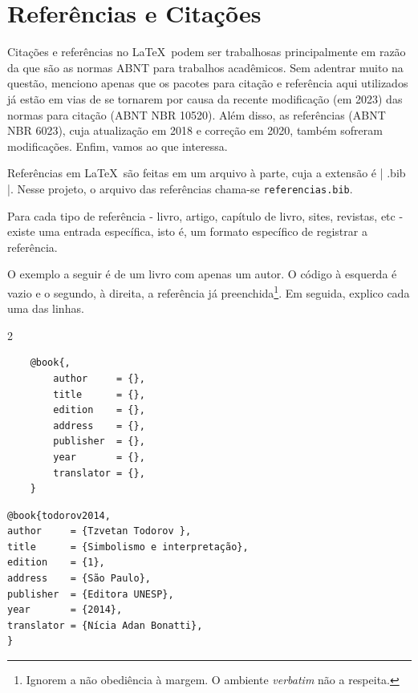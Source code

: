 \chapter{Referências e Citações}

Citações e referências no \LaTeX\ podem ser trabalhosas principalmente em razão da  que são as normas ABNT para trabalhos acadêmicos. Sem adentrar muito na questão, menciono apenas que os pacotes para citação e referência aqui utilizados já estão em vias de se tornarem  por causa da recente modificação (em 2023) das normas para citação (ABNT NBR 10520). Além disso, as referências (ABNT NBR 6023), cuja atualização em 2018 e correção em 2020, também sofreram modificações. Enfim, vamos ao que interessa.

Referências em \LaTeX\ são feitas em um arquivo à parte, cuja a extensão é | .bib |. Nesse projeto, o arquivo das referências chama-se \verb|referencias.bib|.

Para cada tipo de referência - livro, artigo, capítulo de livro, sites, revistas, etc - existe uma entrada específica, isto é, um formato específico de registrar a referência.

O exemplo a seguir é de um livro com apenas um autor. O código à esquerda é vazio e o segundo, à direita, a referência já preenchida\footnote{Ignorem a não obediência à margem. O ambiente \textit{verbatim} não a respeita.}. Em seguida, explico cada uma das linhas.

\begin{multicols}{2}
\begin{verbatim}
	@book{, 
		author     = {},
		title      = {},
		edition    = {},
		address    = {},
		publisher  = {},
		year       = {},
		translator = {},
	}
\end{verbatim}

\begin{verbatim}
@book{todorov2014, 
author     = {Tzvetan Todorov },
title      = {Simbolismo e interpretação},
edition    = {1},
address    = {São Paulo},
publisher  = {Editora UNESP},
year       = {2014},
translator = {Nícia Adan Bonatti},
}
\end{verbatim}
\end{multicols}


